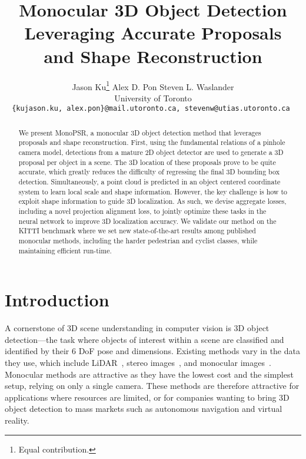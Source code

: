 \documentclass[10pt,twocolumn,letterpaper]{article}
\begin{document}
	
\title{Monocular 3D Object Detection Leveraging Accurate Proposals \\ and Shape Reconstruction}
	
	\author{Jason Ku\thanks{Equal contribution.} \quad Alex D. Pon \quad Steven L. Waslander \\
	University of Toronto \\
	\tt\small\{kujason.ku, alex.pon\}@mail.utoronto.ca, stevenw@utias.utoronto.ca
	}
	
	\maketitle


\begin{abstract}
		We present MonoPSR, a monocular 3D object detection method that leverages proposals and shape reconstruction. First, using the fundamental relations of a pinhole camera model, detections from a mature 2D object detector are used to generate a 3D proposal per object in a scene. The 3D location of these proposals prove to be quite accurate, which greatly reduces the difficulty of regressing the final 3D bounding box detection. Simultaneously, a point cloud is predicted in an object centered coordinate system to learn local scale and shape  information. However, the key challenge is how to exploit shape information to guide 3D localization. As such, we devise aggregate losses, including a novel projection alignment loss, to jointly optimize these tasks in the neural network to improve 3D localization accuracy. We validate our method on the KITTI benchmark where we set new state-of-the-art results among published monocular methods, including the harder pedestrian and cyclist classes, while maintaining efficient run-time.
	\end{abstract}
	
\section{Introduction}
	
	A cornerstone of 3D scene understanding in computer vision is 3D object detection---the task where objects of interest within a scene are classified and identified by their 6 DoF pose and dimensions. Existing methods vary in the data they use, which include LiDAR~\cite{ku_avod, qi_fpointnet, yan2018second, pixor, zhou}, stereo images~\cite{chen_3dop}, and monocular images~\cite{chabot_deepmanta, lindernoren, kundu_3drcnn, mousavian_deep3dbox, xu_multifusion}. Monocular methods are attractive as they have the lowest cost and the simplest setup, relying on only a single camera. These methods are therefore attractive for applications where resources are limited, or for companies wanting to bring 3D object detection to mass markets such as autonomous navigation and virtual reality.
	
\end{document}
